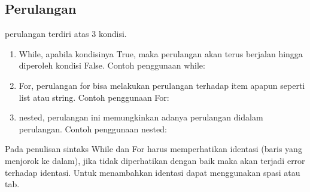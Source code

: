 \subsection{Perulangan}
perulangan terdiri atas 3 kondisi.
\begin{enumerate}
 \item While, apabila kondisinya True, maka perulangan akan terus berjalan hingga diperoleh kondisi False. Contoh penggunaan while:\\

 \item For, perulangan for bisa melakukan perulangan terhadap item apapun seperti list atau string. Contoh penggunaan For:\\

 \item nested, perulangan ini memungkinkan adanya perulangan didalam perulangan. Contoh penggunaan nested:\\

\end{enumerate}
Pada penulisan sintaks While dan For harus memperhatikan identasi (baris yang menjorok ke dalam), jika tidak diperhatikan dengan baik maka akan terjadi error terhadap identasi. Untuk menambahkan identasi dapat menggunakan spasi atau tab.

